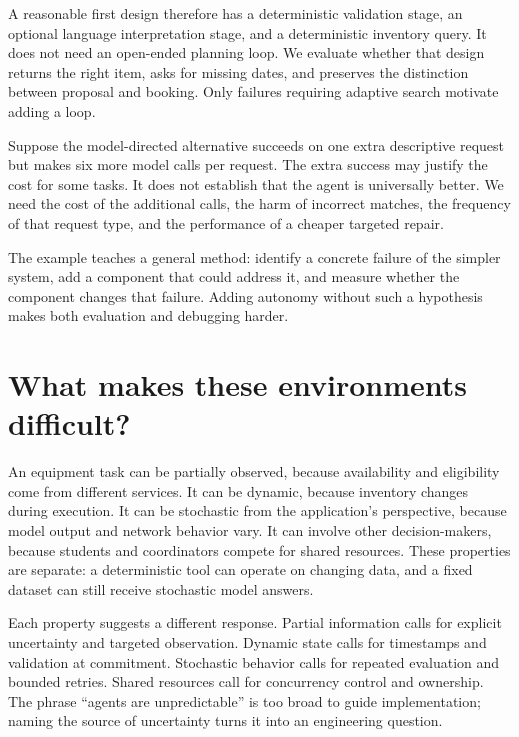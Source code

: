 A reasonable first design therefore has a deterministic validation stage, an optional language interpretation stage, and a deterministic inventory query. It does not need an open-ended planning loop. We evaluate whether that design returns the right item, asks for missing dates, and preserves the distinction between proposal and booking. Only failures requiring adaptive search motivate adding a loop.

Suppose the model-directed alternative succeeds on one extra descriptive request but makes six more model calls per request. The extra success may justify the cost for some tasks. It does not establish that the agent is universally better. We need the cost of the additional calls, the harm of incorrect matches, the frequency of that request type, and the performance of a cheaper targeted repair.

The example teaches a general method: identify a concrete failure of the simpler system, add a component that could address it, and measure whether the component changes that failure. Adding autonomy without such a hypothesis makes both evaluation and debugging harder.

\section{What makes these environments difficult?}
An equipment task can be partially observed, because availability and eligibility come from different services. It can be dynamic, because inventory changes during execution. It can be stochastic from the application's perspective, because model output and network behavior vary. It can involve other decision-makers, because students and coordinators compete for shared resources. These properties are separate: a deterministic tool can operate on changing data, and a fixed dataset can still receive stochastic model answers.

Each property suggests a different response. Partial information calls for explicit uncertainty and targeted observation. Dynamic state calls for timestamps and validation at commitment. Stochastic behavior calls for repeated evaluation and bounded retries. Shared resources call for concurrency control and ownership. The phrase “agents are unpredictable” is too broad to guide implementation; naming the source of uncertainty turns it into an engineering question.

